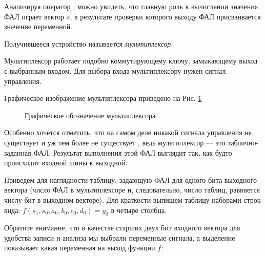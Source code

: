 \par{Анализируя оператор , можно увидеть, что главную роль в вычислении значения ФАЛ играет вектор $s$, в результате проверки которого выходу ФАЛ присваивается значение  переменной.}

\par{Получившееся устройство называется \emph{мультиплексор}}.

\par{Мультиплексор работает подобно коммутирующему ключу, замыкающему выход с выбранным входом. Для выбора входа мультиплексору нужен сигнал управления. }

\par{Графическое изображение мультиплексора приведено на Рис. \ref{fig:mux}}

\begin{figure}[H]
  \centering
  \def\svgwidth{5cm}
  
  \caption{Графическое обозначение мультиплексора}
  \label{fig:mux}
\end{figure}

\par{Особенно хочется отметить, что на самом деле никакой  сигнала управления не существует и уж тем более не существует , ведь мультиплексор — это таблично-заданная ФАЛ. Результат выполнения этой ФАЛ выглядит так, как будто происходит   входной шины к выходной.}

\par{Приведём для наглядности таблицу, задающую ФАЛ для одного бита выходного вектора (число ФАЛ в мультиплексоре и, следовательно, число таблиц, равняется числу бит в выходном векторе). Для краткости выпишем таблицу наборами строк вида: $f(s_1, s_0, a_0, b_0, c_0, d_0) = y_0$ в четыре столбца.}

\par{Обратите внимание, что в качестве старших двух бит входного вектора для удобства записи и анализа мы выбрали переменные  сигнала, а выделение показывает какая переменная  на выход функции $f$:}


